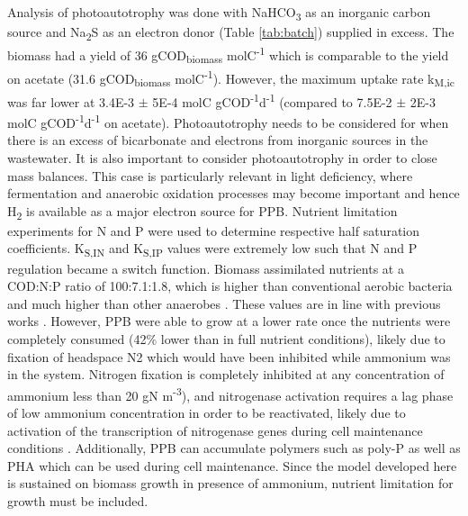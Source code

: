 \skippingparagraph
Analysis of photoautotrophy was done with NaHCO\textsubscript{3} as an inorganic carbon source and Na\textsubscript{2}S as an electron donor (Table \ref{tab:batch}) supplied in excess. The biomass had a yield of 36 gCOD\textsubscript{biomass} molC\textsuperscript{-1} which is comparable to the yield on acetate (31.6 gCOD\textsubscript{biomass} molC\textsuperscript{-1}). However, the maximum uptake rate k\textsubscript{M,ic} was far lower at \num{3.4E-3} $\pm$ \num{5E-4} molC gCOD\textsuperscript{-1}d\textsuperscript{-1} (compared to \num{7.5E-2} $\pm$ \num{2E-3} molC gCOD\textsuperscript{-1}d\textsuperscript{-1} on acetate). Photoautotrophy needs to be considered for when there is an excess of bicarbonate and electrons from inorganic sources in the wastewater. It is also important to consider photoautotrophy in order to close mass balances. This case is particularly relevant in light deficiency, where fermentation and anaerobic oxidation processes may become important and hence H\textsubscript{2} is available as a major electron source for PPB.
\skippingparagraph
Nutrient limitation experiments for N and P were used to determine respective half saturation coefficients. K\textsubscript{S,IN} and K\textsubscript{S,IP} values were extremely low such that N and P regulation became a switch function. Biomass assimilated nutrients at a COD:N:P ratio of 100:7.1:1.8, which is higher than conventional aerobic bacteria and much higher than other anaerobes \cite{tchobanoglous}. These values are in line with previous works \cite{hulsen2014}. However, PPB were able to grow at a lower rate once the nutrients were completely consumed (42\% lower than in full nutrient conditions), likely due to fixation of headspace N2 \cite{hunter2008} which would have been inhibited while ammonium was in the system. Nitrogen fixation is completely inhibited at any concentration of ammonium less than 20 gN m\textsuperscript{-3}), and nitrogenase activation requires a lag phase of low ammonium concentration in order to be reactivated, likely due to activation of the transcription of nitrogenase genes during cell maintenance conditions \cite{masepohl2002}. Additionally, PPB can accumulate polymers such as poly-P \cite{liang2010} as well as PHA \cite{melnicki2009} which can be used during cell maintenance. Since the model developed here is sustained on biomass growth in presence of ammonium, nutrient limitation for growth must be included.


